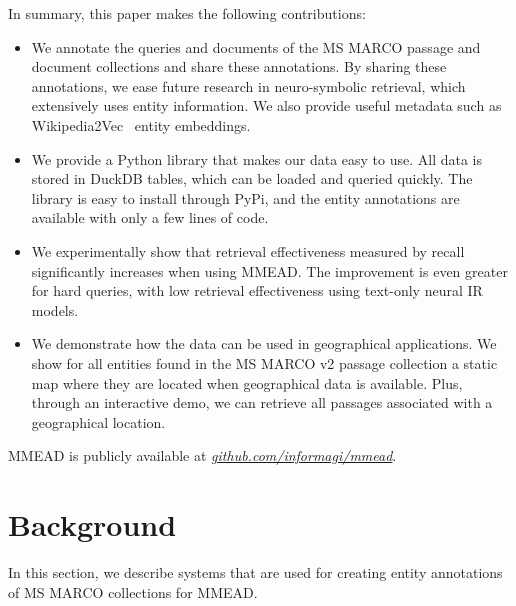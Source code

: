 In summary, this paper makes the following contributions:
\begin{itemize}
	\item We annotate the queries and documents of the MS MARCO passage and document collections and share these annotations. By sharing these annotations, we ease future research in neuro-symbolic retrieval, which extensively uses entity information. We also provide useful metadata such as Wikipedia2Vec~\cite{wikipedia2vec} entity embeddings. 
	\item We provide a Python library that makes our data easy to use. All data is stored in DuckDB tables, which can be loaded and queried quickly. The library is easy to install through PyPi, and the entity annotations are available with only a few lines of code.
	\item We experimentally show that retrieval effectiveness measured by recall significantly increases when using MMEAD. The improvement is even greater for hard queries, with low retrieval effectiveness using text-only neural IR models.
	\item We demonstrate how the data can be used in geographical applications. We show for all entities found in the MS MARCO v2 passage collection a static map where they are located when geographical data is available. Plus, through an interactive demo, we can retrieve all passages associated with a geographical location.  
\end{itemize}

MMEAD is publicly available at \emph{\url{github.com/informagi/mmead}}.


\section{Background}
In this section, we describe systems that are used for creating entity annotations of MS MARCO collections for MMEAD. 

